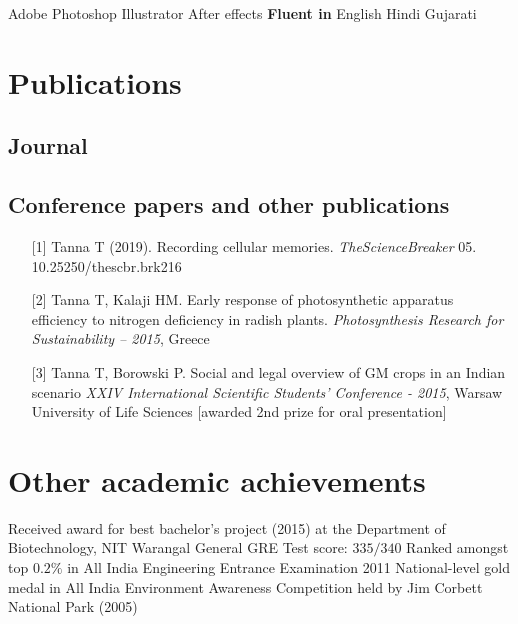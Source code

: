 \documentclass[]{TT-resume}
\begin{document}
\begin{flushleft}
Adobe Photoshop \textbullet{} Illustrator \textbullet{} After effects
\hfill \hfill \textbf{Fluent in } English \textbullet{} Hindi \textbullet{} Gujarati



\sectionsep
\noindent\makebox[\linewidth]{\color{primary}\rule{\paperwidth}{0.4pt}} 

\sectionsep

\section{Publications}
\sectionsep
\subsection{Journal}
\vspace{10pt}
\renewcommand\refname{\vskip -1.5em} %


\nocite{*}
\sectionsep
\subsection{Conference papers and other publications}
\vspace{2pt}
 \begin{enumerate}
 \item [{[1]}] Tanna T (2019). Recording cellular memories. \emph{TheScienceBreaker} 05. 10.25250/thescbr.brk216
 \item [{[2]}] Tanna T, Kalaji HM. Early response of photosynthetic apparatus efficiency to nitrogen deficiency in
radish plants. \emph{Photosynthesis Research for Sustainability – 2015}, Greece
\item [{[3]}] Tanna T, Borowski P. Social and legal overview of GM crops in an Indian scenario \emph{XXIV International Scientific Students' Conference - 2015}, Warsaw University of Life Sciences [awarded 2nd prize for oral presentation]
 \end{enumerate}
\sectionsep
\noindent\makebox[\linewidth]{\color{primary}\rule{\paperwidth}{0.4pt}} 

\sectionsep

\section{Other academic achievements}
\sectionsep
Received award for best bachelor’s project (2015) at the Department of Biotechnology, NIT Warangal \textbullet{} General GRE Test score: $335/340$ \textbullet{} Ranked amongst top $0.2\%$ in All India Engineering Entrance Examination 2011 \textbullet{} National-level gold medal in All India Environment Awareness Competition held by Jim Corbett National Park (2005)
\sectionsep
\vspace{4pt}
\noindent\makebox[\linewidth]{\color{primary}\rule{\paperwidth}{0.4pt}} 
\end{flushleft} 
\end{document}
